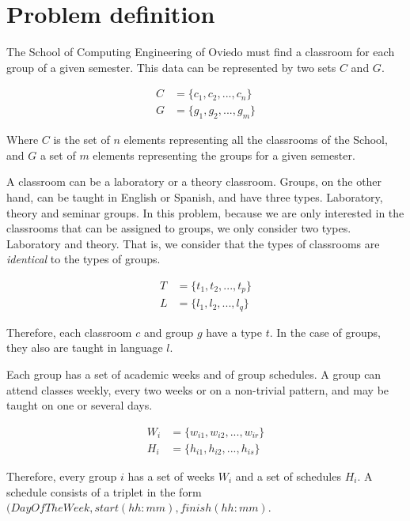 \renewcommand{\documentname}{Problem definition}

\chapter{Problem definition}

The School of Computing Engineering of Oviedo must find a classroom for each group of a given semester. This data can be represented by two sets $C$ and $G$. 

\begin{align}
    C &= \{ c_{1}, c_{2}, ..., c_{n} \}\\
    G &= \{ g_{1}, g_{2}, ..., g_{m} \}
\end{align}

Where $C$ is the set of $n$ elements representing all the classrooms of the School, and $G$ a set of $m$ elements representing the groups for a given semester.

A classroom can be a laboratory or a theory classroom. Groups, on the other hand, can be taught in English or Spanish, and have three types. Laboratory, theory and seminar groups. In this problem, because we are only interested in the classrooms that can be assigned to groups, we only consider two types. Laboratory and theory. That is, we consider that the types of classrooms are \textit{identical} to the types of groups.

\begin{align}
    T &= \{ t_{1}, t_{2}, ..., t_{p} \}\\
    L &= \{ l_{1}, l_{2}, ..., l_{q} \}
\end{align}

Therefore, each classroom $c$ and group $g$ have a type $t$. In the case of groups, they also are taught in language $l$.

Each group has a set of academic weeks and of group schedules. A group can attend classes weekly, every two weeks or on a non-trivial pattern, and may be taught on one or several days.

\begin{align}
    W_{i} &= \{ w_{i1}, w_{i2}, ..., w_{ir} \}\\
    H_{i} &= \{ h_{i1}, h_{i2}, ..., h_{is} \}
\end{align}

Therefore, every group $i$ has a set of weeks $W_{i}$ and a set of schedules $H_{i}$. A schedule consists of a triplet in the form $(DayOfTheWeek, start (hh:mm), finish (hh:mm)$.

